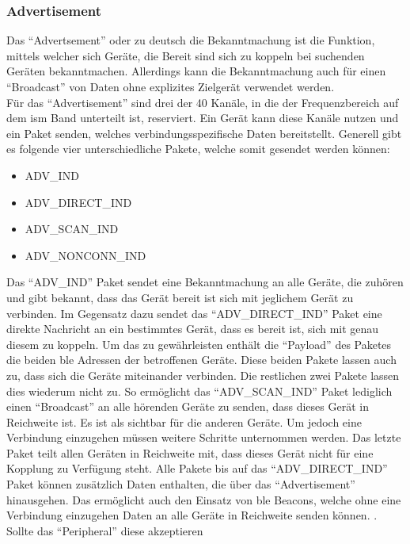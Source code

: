 \subsubsection{Advertisement}
\label{sss:funktionsweise:advertisement}

Das "`Advertsement"' oder zu deutsch die Bekanntmachung ist die Funktion, mittels welcher sich Geräte, die Bereit sind sich zu koppeln bei suchenden Geräten bekanntmachen. Allerdings kann die Bekanntmachung auch für einen "`Broadcast"' von Daten ohne explizites Zielgerät verwendet werden.\\

\noindent Für das "`Advertisement"' sind drei der 40 Kanäle, in die der Frequenzbereich auf dem \ac{ism} Band unterteilt ist, reserviert. Ein Gerät kann diese Kanäle nutzen und ein Paket senden, welches verbindungsspezifische Daten bereitstellt. Generell gibt es folgende vier unterschiedliche Pakete, welche somit gesendet werden können:
\begin{itemize}
	\item{ADV\_IND}
	\item{ADV\_DIRECT\_IND}
	\item{ADV\_SCAN\_IND}
	\item{ADV\_NONCONN\_IND}
\end{itemize} 
Das "`ADV\_IND"' Paket sendet eine Bekanntmachung an alle Geräte, die zuhören und gibt bekannt, dass das Gerät bereit ist sich mit jeglichem Gerät zu verbinden. Im Gegensatz dazu sendet das "`ADV\_DIRECT\_IND"' Paket eine direkte Nachricht an ein bestimmtes Gerät, dass es bereit ist, sich mit genau diesem zu koppeln. Um das zu gewährleisten enthält die "`Payload"' des Paketes die beiden \ac{ble} Adressen der betroffenen Geräte. Diese beiden Pakete lassen auch zu, dass sich die Geräte miteinander verbinden. Die restlichen zwei Pakete lassen dies wiederum nicht zu. So ermöglicht das "`ADV\_SCAN\_IND"' Paket lediglich einen "`Broadcast"' an alle hörenden Geräte zu senden, dass dieses Gerät in Reichweite ist. Es ist als sichtbar für die anderen Geräte. Um jedoch eine Verbindung einzugehen müssen weitere Schritte unternommen werden. Das letzte Paket teilt allen Geräten in Reichweite mit, dass dieses Gerät nicht für eine Kopplung zu Verfügung steht. Alle Pakete bis auf das "`ADV\_DIRECT\_IND"' Paket können zusätzlich Daten enthalten, die über das "`Advertisement"' hinausgehen. Das ermöglicht auch den Einsatz von \ac{ble} Beacons, welche ohne eine Verbindung einzugehen Daten an alle Geräte in Reichweite senden können. \cite{ADV:WWW}.\\
  Sollte das "`Peripheral"' diese akzeptieren
